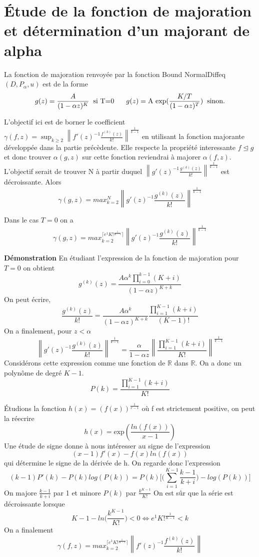 \documentclass[a4paper,10.5pt]{article}
\begin{document}
	
	
	\section{Étude de la fonction de majoration et détermination d'un majorant de alpha}
	La fonction de majoration renvoyée par la fonction Bound NormalDiffeq$(D,P_{\alpha},u)$  est de la  forme
	\[g(z)=\frac{A}{(1-\alpha z)^{K}} \hspace{2mm}\text{si T=0}\hspace{6mm} g(z)=\text{A exp}(\frac{K/T}{(1-\alpha z)^{T}}) \hspace{2mm} \text{sinon.} \]
	
	\noindent L'objectif ici est de borner le coefficient $\gamma(f,z)=\sup_{k \geq 2} \left\|f'(z)^{-1}\frac{f^{(k)}(z)}{k!}\right\|^{\frac{1}{k-1}}$ en utilisant la fonction majorante développée dans la partie précèdente. Elle respecte la propriété interessante $f\unlhd g$ et donc trouver $\alpha(g,z)$ sur cette fonction reviendrai à majorer $\alpha(f,z)$. L'objectif serait de trouver N à partir duquel $\left\|g'(z)^{-1}\frac{g^{(k)}(z)}{k!}\right\|^{\frac{1}{k-1}}$ est décroissante. Alors 
	\[\gamma(g,z)=max_{k=2}^{N}\left\|g'(z)^{-1}\frac{g^{(k)}(z)}{k!}\right\|^{\frac{1}{k-1}}\] 
	
	\begin{proposition} Dans le cas $T=0$ on a \[\gamma(g,z)=max_{k=2}^{\lceil e^{1}K!^{\frac{1}{K-1}} \rceil}\left\|g'(z)^{-1}\frac{g^{(k)}(z)}{k!}\right\|^{\frac{1}{k-1}}\]
	\end{proposition}

	\noindent\textbf{Démonstration}
	\noindent En étudiant l'expression de la fonction de majoration pour $T=0$ on obtient
	\[g^{(k)}(z)=\frac{A\alpha^{k}\prod_{i=0}^{k-1}(K+i)}{(1-\alpha z)^{K+k}}\]
	On peut écrire,
	\[\frac{g^{(k)}(z)}{k!}=\frac{A\alpha^{k}}{(1-\alpha z)^{K+k}} \frac{\prod_{i=1}^{K-1}(k+i)}{(K-1)!} \]
	On a finalement, pour $z < \alpha$ 
	\[\left\|g'(z)^{-1}\frac{g^{(k)}(z)}{k!}\right\|^{\frac{1}{k-1}}= \frac{\alpha}{1-\alpha z} \left\|\frac{\prod_{i=1}^{K-1}(k+i)}{K!}\right\|^{\frac{1}{k-1}} \tag{*}\]
	Considérons cette expression comme une fonction de $\mathbb{R}$ dans $\mathbb{R}$. On a donc un polynôme de degré $K-1$.
	\[P(k)=\frac{\prod_{i=1}^{K-1}(k+i)}{K!}\]
	
	
	\noindent Étudions la fonction $h(x)=(f(x))^{\frac{1}{x-1}}$ où f est strictement positive, on peut la réecrire
	\[h(x)=\text{exp}(\frac{ln(f(x))}{x-1}) \]
	Une étude de signe donne à nous intéresser au signe de l'expression
	\[(x-1)f'(x)-f(x)ln(f(x)) \tag{1}\] 
	qui détermine le signe de la dérivée de h. On regarde donc l'expression 
	\[(k-1)P'(k)-P(k)log(P(k))=P(k)\Big[\big(\sum_{i=1}^{K-1}\frac{k-1}{k+i}\big)-log(P(k))\Big]\]
	On majore $\frac{k-1}{k+i}$ par 1 et minore $P(k)$ par $\frac{k^{K-1}}{K!}$ On est sûr que la série est décroissante lorsque 
	\[K-1-ln\big(\frac{k^{K-1}}{K!}\big)<0 \Longleftrightarrow e^{1}K!^{\frac{1}{K-1}}< k\]
	On a finalement 
	\[\gamma(f,z)=max_{k=2}^{\lceil e^{1}K!^{\frac{1}{K-1}} \rceil}\left\|f'(z)^{-1}\frac{f^{(k)}(z)}{k!}\right\| \]
	
\end{document}
